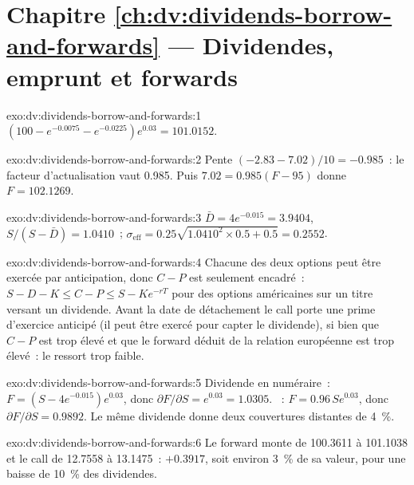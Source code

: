 \section*{Chapitre \ref{ch:dv:dividends-borrow-and-forwards} --- Dividendes, emprunt et forwards}

\begin{solution}{exo:dv:dividends-borrow-and-forwards:1}
$(100-e^{-0.0075}-e^{-0.0225})e^{0.03}=101.0152$.
\end{solution}

\begin{solution}{exo:dv:dividends-borrow-and-forwards:2}
Pente $(-2.83-7.02)/10=-0.985$~: le facteur d'actualisation vaut 0.985. Puis $7.02=0.985(F-95)$ donne
$F=102.1269$.
\end{solution}

\begin{solution}{exo:dv:dividends-borrow-and-forwards:3}
$\bar D=4e^{-0.015}=3.9404$, $S/(S-\bar D)=1.0410$~;
$\sigma_{\mathrm{eff}}=0.25\sqrt{1.0410^2\times0.5+0.5}=0.2552$.
\end{solution}

\begin{solution}{exo:dv:dividends-borrow-and-forwards:4}
Chacune des deux options peut être exercée par anticipation, donc $C-P$ est seulement encadré~:
$S-D-K\le C-P\le S-Ke^{-rT}$ pour des options américaines sur un titre versant un dividende. Avant la date de détachement
le call porte une prime d'exercice anticipé (il peut être exercé pour capter le
dividende), si bien que $C-P$ est trop élevé et que le forward déduit de la relation européenne est trop
élevé~: le  ressort trop faible.
\end{solution}

\begin{solution}{exo:dv:dividends-borrow-and-forwards:5}
Dividende en numéraire~: $F=(S-4e^{-0.015})e^{0.03}$, donc $\partial F/\partial S=e^{0.03}=1.0305$.
~: $F=0.96\,Se^{0.03}$, donc $\partial F/\partial S=0.9892$. Le même dividende
donne deux couvertures distantes de 4~\%.
\end{solution}

\begin{solution}{exo:dv:dividends-borrow-and-forwards:6}
Le forward monte de 100.3611 à 101.1038 et le call de 12.7558 à 13.1475~: $+0.3917$,
soit environ 3~\% de sa valeur, pour une baisse de 10~\% des dividendes.
\end{solution}

